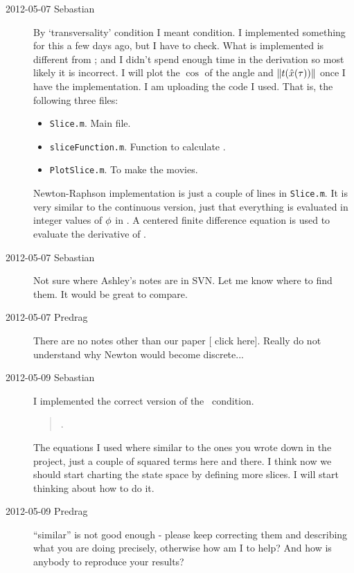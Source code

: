 \begin{description}
\item[2012-05-07 Sebastian]
By `transversality' condition I meant {\chartBord}  condition. I
implemented something for this a few days ago, but I have to check. What
is implemented is different from ; and I didn't spend enough
time in the derivation so most likely it is incorrect. I will plot the
$\cos$ of the angle and $\|{t(\hat{x}(\tau))}\|$ once I have
the implementation. I am uploading the code I used. That is, the
following three files:
\begin{itemize}
  \item \verb"Slice.m". Main file.
  \item \verb"sliceFunction.m". Function to calculate .
  \item \verb"PlotSlice.m". To make the movies.
\end{itemize}
Newton-Raphson implementation is just a couple of lines in
\verb"Slice.m". It is very similar to the continuous version, just that
everything is evaluated in integer values of ${\bf \phi}$ in . A
centered finite difference equation is used to evaluate the derivative of
.

\item[2012-05-07 Sebastian]
Not sure where Ashley's notes are in SVN. Let me know where
 to find them. It would be great to compare.

\item[2012-05-07 Predrag] There are no notes other than our
paper
[
{click here}]. Really do not understand why Newton would become
discrete...

\item[2012-05-09 Sebastian]
I implemented the correct version of the \chartBord\ condition.
\begin{quote}
.
\end{quote}
The equations I used where similar to the ones you wrote down in the
project, just a couple of squared terms here and there. I think now we
should start charting the state space by defining more slices. I will
start thinking about how to do it.

\item[2012-05-09 Predrag] ``similar'' is not good enough - please keep
correcting them and describing what you are doing precisely, otherwise
how am I to help? And how is anybody to reproduce your results?


\end{description}
